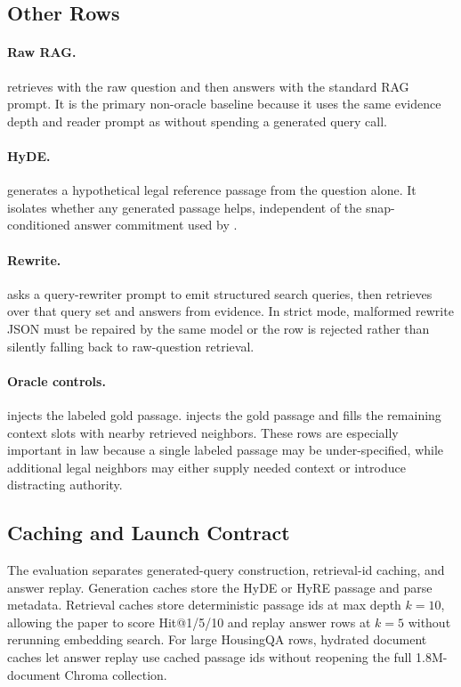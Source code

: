 \subsection{Other Rows}

\paragraph{Raw RAG.}
 retrieves with the raw question and then answers with the
standard RAG prompt. It is the primary non-oracle baseline because it uses the
same evidence depth and reader prompt as \hyre{} without spending a generated
query call.

\paragraph{HyDE.}
 generates a hypothetical legal reference passage from the
question alone. It isolates whether any generated passage helps, independent of
the snap-conditioned answer commitment used by \hyre{}.

\paragraph{Rewrite.}
 asks a query-rewriter prompt to emit structured search
queries, then retrieves over that query set and answers from evidence. In
strict mode, malformed rewrite JSON must be repaired by the same model or the
row is rejected rather than silently falling back to raw-question retrieval.

\paragraph{Oracle controls.}
 injects the labeled gold passage. 
injects the gold passage and fills the remaining context slots with nearby
retrieved neighbors. These rows are especially important in law because a
single labeled passage may be under-specified, while additional legal neighbors
may either supply needed context or introduce distracting authority.

\subsection{Caching and Launch Contract}

The evaluation separates generated-query construction, retrieval-id caching,
and answer replay. Generation caches store the HyDE or HyRE passage and parse
metadata. Retrieval caches store deterministic passage ids at max depth
$k=10$, allowing the paper to score Hit@1/5/10 and replay answer rows at
$k=5$ without rerunning embedding search. For large HousingQA rows, hydrated
document caches let answer replay use cached passage ids without reopening the
full 1.8M-document Chroma collection.

